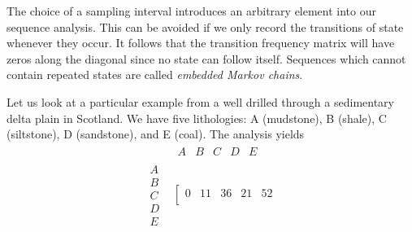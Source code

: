 	The choice of a sampling interval introduces an arbitrary element into our sequence analysis.  
This can be avoided if we only record the transitions of state whenever they occur.  It follows 
that the transition frequency matrix will have zeros along the diagonal since no state can follow 
itself.  Sequences which cannot contain repeated states are called \emph{embedded Markov chains}.
\begin{example}
	Let us look at a particular example from a well drilled through a sedimentary delta plain in
Scotland.  We have five lithologies: A (mudstone), B (shale), C (siltstone), D 
(sandstone), and E (coal).  The analysis yields
\begin{equation}
\begin{array}{*{20}{c}}
{}&{\begin{array}{*{20}{c}}
A&B&C&D&E
\end{array}}\\
{\begin{array}{*{20}{c}}
A\\
B\\
C\\
D\\
E
\end{array}}&{\left[ {\begin{array}{*{20}{c}}
0&{11}&{36}&{21}&{52}\\

\end{array}}}
\end{array}
\end{equation}
\end{example}
